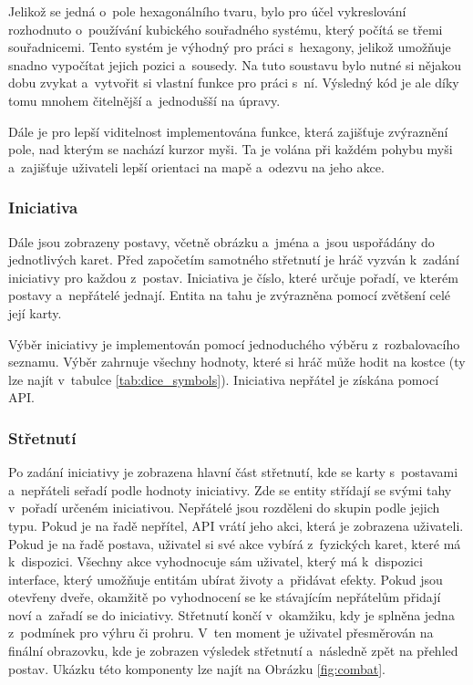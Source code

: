 Jelikož se jedná o~pole hexagonálního tvaru, bylo pro účel vykreslování rozhodnuto o~používání kubického souřadného systému, který počítá se třemi souřadnicemi. Tento systém je výhodný pro práci s~hexagony, jelikož umožňuje snadno vypočítat jejich pozici a~sousedy. Na tuto soustavu bylo nutné si nějakou dobu zvykat a~vytvořit si vlastní funkce pro práci s~ní. Výsledný kód je ale díky tomu mnohem čitelnější a~jednodušší na úpravy.

Dále je pro lepší viditelnost implementována funkce, která zajišťuje zvýraznění pole, nad kterým se nachází kurzor myši. Ta je volána při každém pohybu myši a~zajišťuje uživateli lepší orientaci na mapě a~odezvu na jeho akce.

\subsubsection*{Iniciativa}
Dále jsou zobrazeny postavy, včetně obrázku a~jména a~jsou uspořádány do jednotlivých karet. Před započetím samotného střetnutí je hráč vyzván k~zadání iniciativy pro každou z~postav. Iniciativa je číslo, které určuje pořadí, ve kterém postavy a~nepřátelé jednají. Entita na tahu je zvýrazněna pomocí zvětšení celé její karty.

Výběr iniciativy je implementován pomocí jednoduchého výběru z~rozbalovacího seznamu. Výběr zahrnuje všechny hodnoty, které si hráč může hodit na kostce (ty lze najít v~tabulce \ref{tab:dice_symbols}). Iniciativa nepřátel je získána pomocí API.

\subsubsection*{Střetnutí}
Po zadání iniciativy je zobrazena hlavní část střetnutí, kde se karty s~postavami a~nepřáteli seřadí podle hodnoty iniciativy. Zde se entity střídají se svými tahy v~pořadí určeném iniciativou. Nepřátelé jsou rozděleni do skupin podle jejich typu. Pokud je na řadě nepřítel, API vrátí jeho akci, která je zobrazena uživateli. Pokud je na řadě postava, uživatel si své akce vybírá z~fyzických karet, které má k~dispozici. Všechny akce vyhodnocuje sám uživatel, který má k~dispozici interface, který umožňuje entitám ubírat životy a~přidávat efekty. Pokud jsou otevřeny dveře, okamžitě po vyhodnocení se ke stávajícím nepřátelům přidají noví a~zařadí se do iniciativy. Střetnutí končí v~okamžiku, kdy je splněna jedna z~podmínek pro výhru či prohru. V~ten moment je uživatel přesměrován na finální obrazovku, kde je zobrazen výsledek střetnutí a~následně zpět na přehled postav. Ukázku této komponenty lze najít na Obrázku \ref{fig:combat}.

